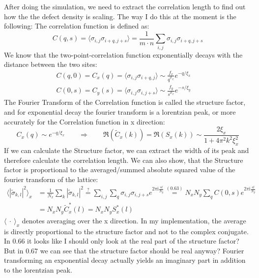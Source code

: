 	After doing the simulation, we need to extract the correlation length to find out how the the defect density is scaling. The way I do this at the moment is the following:
	The correlation function is defined as:
	\begin{equation}
		C(q,s) =	\langle \sigma_{i,j} \sigma_{i +q ,j +s} \rangle = 	\frac{1}{m \cdot n} \sum_{i, j} \sigma_{i,j} \sigma_{i +q ,j +s}
	\end{equation}
	We know that the two-point-correlation function exponentially decays with the distance between the two sites:
	\begin{align}
		&C(q, 0) =	C_x(q) = \langle \sigma_{i,j} \sigma_{i +q ,j} \rangle \sim \frac{f_x}{q^{\vartheta_\gtrless}} 	e^{-q /	\xi_x} \qquad \\
		&C(0, s) =	C_y(s) =	\langle \sigma_{i,j} \sigma_{i ,j + s} \rangle \sim \frac{f_y}{s^{\vartheta_\gtrless}} 	e^{-s /	\xi_y} \qquad
	\end{align}
	The Fourier Transform of the Correlation function is called the structure factor, and for exponential decay the fourier transform is a lorentzian peak, or more accurately for the Correlation function in x direction:
	\begin{equation}
		C_x(q) \sim e^{-q /	\xi_x} \qquad \Rightarrow \qquad \Re\left(\tilde{C}_x(k)\right) = \Re \left(S_x(k) \right) \sim \frac{2 \xi_x}{1 + 4 \pi^2 k^2 \xi_x^2}
	\end{equation}
	If we can calculate the Structure factor, we can extract the width of its peak and therefore calculate the correlation length.
	We can also show, that the Structure factor is proportional to the averaged/summed absolute squared value of the fourier transform of the lattice:
	\begin{align}
		\langle |\tilde{\sigma}_{k, l}|^2 \rangle_x &=	\frac{1}{N_x} \sum_k  |\tilde{\sigma}_{k, l}|^2 \overset{?}{=} \sum_{i, j} \sum_q \sigma_{i, j}\sigma_{i, j+s} e^{2\pi \mathrm{i} \frac{sl}{N_y}} \overset{(0.63)}{=} N_x N_y \sum_q C(0, s) e^{2\pi \mathrm{i} \frac{sl}{N_y}}	\\
		&= N_x N_y \tilde{C}_x^*(l) =	N_x N_y S_x^*(l)
	\end{align}
	$\langle ~ \cdot~ \rangle_x$ denotes averaging over the x direction. In my implementation, the average is directly proportional to the structure factor and not to the complex conjugate. In 0.66 it looks like I should only look at the real part of the structure factor? But in 0.67 we can see that the structure factor should be real anyway? Fourier transforming an exponential decay actually yields an imaginary part in addition to the lorentzian peak.
	
